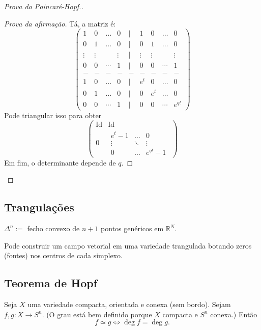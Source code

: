 \begin{proof}[Prova do Poincaré-Hopf.]
\begin{proof}[Prova da afirmação]
	Tá, a matriz é:
	\[\begin{pmatrix} 1 & 0 & \ldots & 0 & | & 1 & 0 & \ldots & 0\\
	0 & 1 & \ldots & 0 & | & 0 & 1 & \ldots & 0\\
	\vdots  & \vdots  & & \vdots & | & \vdots  & \vdots  &  & \vdots \\
	0 & 0 & \cdots & 1 &| & 0 & 0 & \cdots & 1\\
	-&-&-&-&-&-&-& - & -\\
	1 & 0 & \ldots & 0 & | & e^t & 0 & \ldots & 0\\
	0 & 1 & \ldots & 0 & | & 0 & e^t & \ldots & 0\\
	0 & 0 & \cdots & 1  &| & 0 & 0 & \cdots & e^{qt}
	\end{pmatrix} \]
Pode triangular isso para obter
\[\begin{pmatrix} \operatorname{Id} &  \operatorname{Id}\\
0 &  \begin{matrix} e^{t}-1 &  \ldots &  0\\
\vdots &  \ddots &  \vdots \\
0&  \ldots &  e^{qt}-1\end{matrix} \end{pmatrix} \]
Em fim, o determinante depende de \(q\).
\end{proof}
\end{proof}

\subsection{Trangulações}

\(\Delta^n:=\) fecho convexo de  \(n+1\) pontos genéricos em \(\mathbb{R}^N\).

Pode construir um campo vetorial em uma variedade trangulada botando zeros (fontes) nos centros de cada simplexo.


\subsection{Teorema de Hopf}

\begin{thm}[de Hopf]\leavevmode
Seja \(X\) uma variedade compacta, orientada e conexa (sem bordo). Sejam \(f,g:X \to S^{n}\). (O grau está bem definido porque \(X\) compacta e \(S^n\) conexa.) Então
\[f \simeq g \iff \operatorname{deg}f=\operatorname{deg}g.\]
\end{thm}

